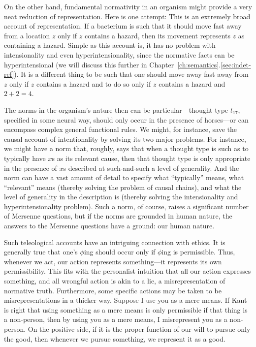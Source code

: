 On the other hand, fundamental normativity in an organism might provide a very neat reduction of representation. Here is one attempt: 
 This is an extremely broad account of representation. If a bacterium is such that it 
should move fast away from a location $z$ only if $z$ contains a hazard, then its movement represents $z$ as containing 
a hazard. Simple as this account is, it has no problem with intensionality and even hyperintensionality, since the 
normative facts can be hyperintensional (we will discuss this further in Chapter~\ref{ch:semantics}.\ref{sec:indet-ref}). It is a different thing to be such that one should move 
away fast away from $z$ only if $z$ contains a hazard and to do so only if $z$ contains a hazard and $2+2=4$.

The norms in the organism's nature then can be particular---thought type $t_{17}$, specified in some neural way, should 
only occur in the presence of horses---or can encompass complex general functional rules. We might, for instance, 
save the causal account of intentionality by solving its two major problems. For instance, we might have a norm that, roughly, 
says that when a thought type is such as to typically have $x$s as its relevant cause, then that thought type is only appropriate
in the presence of $x$s described at such-and-such a level of generality. And the norm can have a vast amount of detail to 
specify what ``typically'' means, what ``relevant'' means (thereby solving the problem of causal chains), and what the level 
of generality in the description is (thereby solving the intensionality and hyperintensionality problem). Such a norm, of course,
raises a significant number of Mersenne questions, but if the norms are grounded in human nature, the answers to the Mersenne 
questions have a ground: our human nature.

Such teleological accounts have an intriguing connection with ethics. It is generally true that one's $\phi$ing should occur only 
if $\phi$ing is permissible. Thus, whenever we act, our action represents something---it represents its own permissibility. 
This fits with the personalist intuition that all our action expresses something, and all wrongful
action is akin to a lie, a misrepresentation of normative truth. Furthermore, some specific actions may be taken to be 
misrepresentations in a thicker way. Suppose I use you as a mere means. If Kant is right that using something as a mere means 
is only permissible if that thing is a non-person, then by using you as a mere means, I misrepresent you as a non-person.  
On the positive side, if it is the proper function of our will to pursue only the good, then whenever we pursue something, we 
represent it as a good. 

